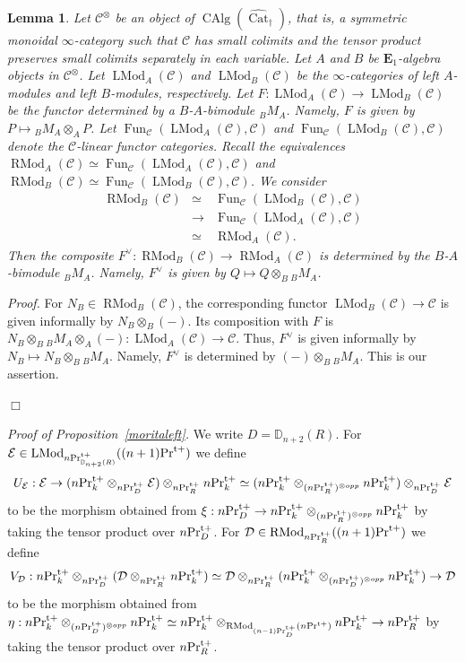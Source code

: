 \documentclass[leqno,12pt]{amsart}
\theoremstyle{plain}
\newtheorem{Lemma}[Theorem]{Lemma}
\theoremstyle{definition}
\newcommand{\DD}{\mathbb{D}}
\newcommand{\EE}{\mathcal{E}}
\newcommand{\DDD}{\mathcal{D}}
\newcommand{\CCC}{\mathcal{C}}
\newcommand{\PRTT}{\textup{Pr}^{\textup{t}+}}
\newcommand{\Fun}{\operatorname{Fun}}
\newcommand{\CAlg}{\operatorname{CAlg}}
\newcommand{\vCat}{\widehat{\operatorname{Cat}}_\dagger}
\newcommand{\eone}{\mathbf{E}_1}
\newcommand{\LMod}{\operatorname{LMod}}
\newcommand{\RMod}{\operatorname{RMod}}
\newcommand{\Proof}{{\sl Proof.}\quad}
\newcommand{\QED}{{\unskip\nobreak\hfil\penalty50\quad\null\nobreak\hfil
{$\Box$}\parfillskip0pt\finalhyphendemerits0\par\medskip}}
\begin{document}
\begin{Lemma}
\label{dualkernel}
Let $\CCC^\otimes$ be an object of $\CAlg(\vCat)$, that is,
a symmetric monoidal $\infty$-category such that $\CCC$ has small colimits and the 
tensor product preserves small colimits separately in each variable.
Let $A$ and $B$ be $\eone$-algebra objects in $\CCC^\otimes$.
Let $\LMod_A(\CCC)$ and $\LMod_B(\CCC)$ be the $\infty$-categories 
of left $A$-modules and left $B$-modules, respectively.
Let $F:\LMod_A(\CCC)\to \LMod_B(\CCC)$ be the functor determined by
a $B$-$A$-bimodule ${}_BM_A$. Namely, $F$ is given by $P\mapsto {}_BM_A\otimes_AP$.
Let $\Fun_{\CCC}(\LMod_A(\CCC),\CCC)$ and $\Fun_{\CCC}(\LMod_B(\CCC),\CCC)$
denote the $\CCC$-linear functor categories.
Recall the equivalences 
$\RMod_A(\CCC)\simeq \Fun_{\CCC}(\LMod_A(\CCC),\CCC)$ and $\RMod_B(\CCC)\simeq \Fun_{\CCC}(\LMod_B(\CCC),\CCC)$.
We consider 
\begin{eqnarray*}
\RMod_B(\CCC)   &\simeq& \Fun_{\CCC}(\LMod_B(\CCC),\CCC)  \\
&\to&  \Fun_{\CCC}(\LMod_A(\CCC),\CCC) \\
&\simeq& \RMod_A(\CCC).
\end{eqnarray*}
Then the composite $F^\vee:\RMod_B(\CCC)\to \RMod_A(\CCC)$ is
determined by the $B$-$A$-bimodule ${}_BM_A$. Namely, $F^\vee$ is given by $Q\mapsto Q\otimes_B{}_BM_A$.
\end{Lemma}

\Proof
For $N_B\in\RMod_B(\CCC)$, the corresponding functor $\LMod_B(\CCC)\to \CCC$ is given informally by $N_B\otimes_B(-)$.
Its composition with $F$ is $N_B\otimes_B{}_BM_A\otimes_A(-):\LMod_A(\CCC)\to \CCC$.
Thus, $F^\vee$ is given informally by $N_B\mapsto N_B\otimes_B{}_BM_A$.
Namely, $F^\vee$ is determined by  $(-)\otimes_B{}_BM_A$. This is our assertion.
\QED










{\it Proof of Proposition~\ref{moritaleft}.}
We write $D=\DD_{n+2}(R)$.
For $\EE\in \LMod_{n\PRTT_{\DD_{n+2}(R)}}((n+1)\PRTT)$ we define
\[
U_{\EE}:\EE\to (n\PRTT_k\otimes_{n\PRTT_{D}}\EE)\otimes_{n\PRTT_R}n\PRTT_k \simeq (n\PRTT_k\otimes_{(n\PRTT_R)^{\otimes opp}}n\PRTT_k)\otimes_{n\PRTT_{D}}\EE
\]
to be the morphism obtained from $\xi:n\PRTT_{D}\to n\PRTT_k\otimes_{(n\PRTT_R)^{\otimes opp}}n\PRTT_k$
by taking the tensor product over $n\PRTT_{D}$.
For $\DDD\in \RMod_{n\PRTT_{R}}((n+1)\PRTT)$ we define
\[
V_{\DDD}:n\PRTT_k\otimes_{n\PRTT_{D}}(\DDD\otimes_{n\PRTT_{R}}n\PRTT_k) \simeq  \DDD\otimes_{n\PRTT_{R}}(n\PRTT_k\otimes_{(n\PRTT_{D})^{\otimes opp}}n\PRTT_k)\to \DDD
\]
to be the morphism obtained from $\eta:n\PRTT_k\otimes_{(n\PRTT_{D})^{\otimes opp}}n\PRTT_k\simeq n\PRTT_k\otimes_{\RMod_{(n-1)\PRTT_{D}}(n\PRTT)}n\PRTT_k\to n\PRTT_R$
by taking the tensor product over $n\PRTT_{R}$.
\end{document}
